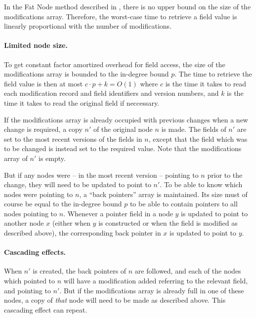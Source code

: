 In the Fat Node method described in \cite{Driscoll198986}, there is no upper
bound on the size of the modifications array. Therefore, the worst-case time to
retrieve a field value is linearly proportional with the number of
modifications.

\paragraph{Limited node size.}

To get constant factor amortized overhead for field access, the size of the
modifications array is bounded to the in-degree bound $p$. The time to retrieve
the field value is then at most $c \cdot p + k = O(1)$ where $c$ is the time it
takes to read each modification record and field identifiers and version
numbers, and $k$ is the time it takes to read the original field if neccessary.

If the modifications array is already occupied with previous changes when a new
change is required, a copy $n'$ of the original node $n$ is made. The fields of
$n'$ are set to the most recent versions of the fields in $n$, except that the
field which was to be changed is instead set to the required value. Note that
the modifications array of $n'$ is empty.

But if any nodes were -- in the most recent version -- pointing to $n$ prior to
the change, they will need to be updated to point to $n'$. To be able to know
which nodes were pointing to $n$, a ``back pointers'' array is maintained. Its
size must of course be equal to the in-degree bound $p$ to be able to contain
pointers to all nodes pointing to $n$. Whenever a pointer field in a node $y$ is
updated to point to another node $x$ (either when $y$ is constructed or when the
field is modified as described above), the corresponding back pointer in $x$ is
updated to point to $y$.

\paragraph{Cascading effects.}

When $n'$ is created, the back pointers of $n$ are followed, and each of the
nodes which pointed to $n$ will have a modification added referring to the
relevant field, and pointing to $n'$. But if the modifications array is already
full in one of these nodes, a copy of \emph{that} node will need to be made as
described above. This cascading effect can repeat.

